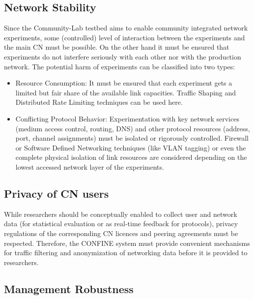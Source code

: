 \documentclass[conference]{IEEEtran}
\begin{document}
\subsection{Network Stability}
Since the Community-Lab testbed aims to enable community integrated network
experiments, some (controlled) level of interaction between the
experiments and the main CN must be possible. On the other hand it
must be ensured that experiments do not interfere seriously with each
other nor with the production network.  The potential harm of
experiments can be classified into two types:

\begin{itemize}

\item Resource Consumption: It must be ensured that each experiment
  gets a limited but fair share of the available link capacities.
  Traffic Shaping and Distributed Rate Limiting techniques can be used
  here.

\item Conflicting Protocol Behavior: Experimentation with key network
  services (medium access control, routing, DNS) and other protocol
  resources (address, port, channel assignments) must be isolated or
  rigorously controlled.  Firewall or Software Defined Networking
  techniques (like VLAN tagging) or even the complete physical
  isolation of link resources are considered depending on the lowest
  accessed network layer of the experiments.

\end{itemize}

\subsection{Privacy of CN users}

While researchers should be conceptually enabled to collect user
and network data (for statistical evaluation or as real-time feedback
for protocols), privacy regulations of the corresponding CN licences
and peering agreements must be respected.
Therefore, the CONFINE system must provide convenient mechanisms for
traffic filtering and anonymization of networking data before it is
provided to researchers.

\subsection{Management Robustness}
\end{document}
